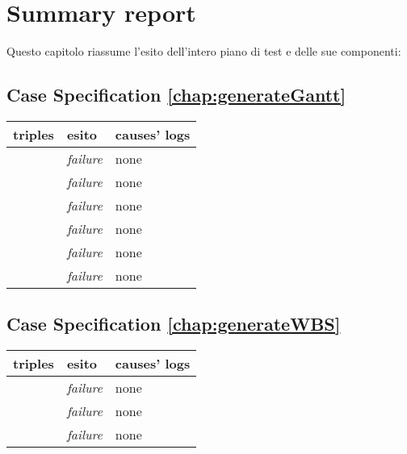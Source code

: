 \chapter{Summary report}
\label{chap:summary_report}

Questo capitolo riassume l'esito dell'intero piano di test e delle sue
componenti:

\section{Case Specification \ref{chap:generateGantt}}

\begin{table}[h!]
  \begin{center}
    \begin{tabular}{| l | l | p{60mm} |}
    \hline
    \textbf{triples} & \textbf{esito} & \textbf{causes' logs} \\
	\hline    
	\nameref{sec:ganttBasicTaskRepresentation} & \emph{failure} & none \\
    \hline
	\nameref{sec:ganttComposedTaskRepresentation} & \emph{failure} & none \\
    \hline
	\nameref{sec:actualTimeTaskRepresentation} & \emph{failure} & none \\
    \hline
    \nameref{sec:identifierNameTaskRepresentation} & \emph{failure} & none \\
    \hline
    \nameref{sec:ganttResourcesTaskRepresentation} & \emph{failure} & none \\
    \hline
    \nameref{sec:TNDependencyrepresentation} & \emph{failure} & none \\
    \hline
    \end{tabular}
  \end{center}
\end{table}

\section{Case Specification \ref{chap:generateWBS}}

\begin{table}[h!]
  \begin{center}
    \begin{tabular}{| l | l | p{60mm} |}
    \hline
    \textbf{triples} & \textbf{esito} & \textbf{causes' logs} \\
	\hline    
	\nameref{sec:WBSTaskRepresentation} & \emph{failure} & none \\
    \hline
	\nameref{sec:WBSDimensionRepresentation} & \emph{failure} & none \\
    \hline
	\nameref{sec:wbs_compositionRelationsRepresentation} & \emph{failure} & none \\
    \hline
    \end{tabular}
  \end{center}
\end{table}

